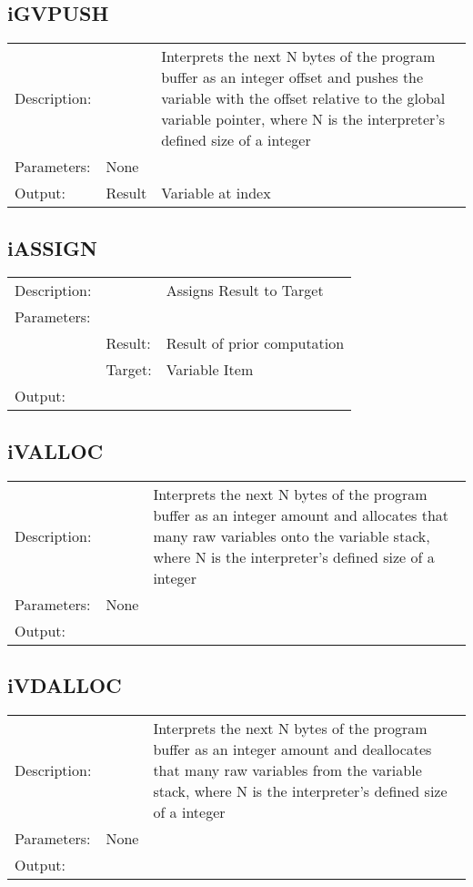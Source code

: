 \documentclass{standalone}
\begin{document}
\subsection{iGVPUSH}
\begin{tabular}{l l p{10cm}}
Description: & ~    & Interprets the next N bytes of the program buffer as an integer offset and pushes the variable with the offset relative to the global variable pointer, where N is the interpreter's defined size of a integer \\
Parameters:  & None & ~ \\
Output:      & Result & Variable at index\\
\end{tabular}

\subsection{iASSIGN}
\begin{tabular}{l l p{10cm}}
Description: & ~    & Assigns Result to Target\\
Parameters:  & ~ & ~ \\
~			 & Result: & Result of prior computation\\
~			 & Target: & Variable Item\\
Output:      & ~ & ~\\
\end{tabular}

\subsection{iVALLOC}
\begin{tabular}{l l p{10cm}}
Description: & ~    & Interprets the next N bytes of the program buffer as an integer amount and allocates that many raw variables onto the variable stack, where N is the interpreter's defined size of a integer \\
Parameters:  & None & ~ \\
Output:      & ~ & ~\\
\end{tabular}

\subsection{iVDALLOC}
\begin{tabular}{l l p{10cm}}
Description: & ~    & Interprets the next N bytes of the program buffer as an integer amount and deallocates that many raw variables from the variable stack, where N is the interpreter's defined size of a integer \\
Parameters:  & None & ~ \\
Output:      & ~ & ~\\
\end{tabular}
\end{document}
